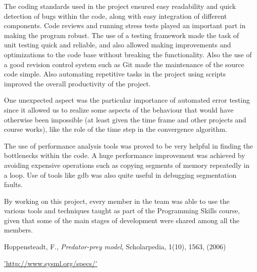 \documentclass[12pt,a4paper]{article}
\begin{document}
The coding standards used in the project ensured easy readability and quick detection of bugs within the code, along with easy integration of different components. Code reviews and running stress tests played an important part in making the program robust. The use of a testing framework made the task of unit testing quick and reliable, and also allowed making improvements and optimizations to the code base without breaking the functionality. Also the use of a good revision control system such as Git made the maintenance of the source code simple. Also automating repetitive tasks in the project using scripts improved the overall productivity of the project.
 
One unexpected aspect was the particular importance of automated error testing since it allowed us to realize some aspects of the behaviour that would have otherwise been impossible (at least given the time frame and other projects and course works), like the role of the time step in the convergence algorithm.

The use of performance analysis tools was proved to be very helpful in finding the bottlenecks within the code. A huge performance improvement was achieved by avoiding expensive operations such as copying segments of memory repeatedly in a loop. Use of tools like gdb was also quite useful in debugging segmentation faults.

By working on this project, every member in the team was able to use the various tools and techniques taught as part of the Programming Skills course, given that some of the main stages of development were shared among all the members.
 




\begin{thebibliography}{100}


 Hoppensteadt, F., \emph{Predator-prey model}, Scholarpedia, 1(10), 1563, (2006)

 \url{'http://www.sysml.org/specs/'}


\end{thebibliography}
\end{document}
